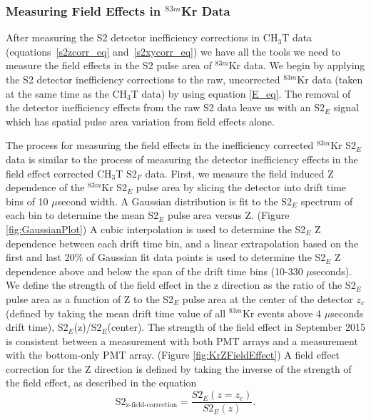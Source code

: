  
\subsubsection{Measuring Field Effects in $^{83m}$Kr Data} \label{section:FieldEffects}

After measuring the S2 detector inefficiency corrections in CH$_3$T data (equations~\ref{s2zcorr_eq} and~\ref{s2xycorr_eq}) we have all the tools we need to measure the field effects in the S2 pulse area of $^{83m}$Kr data.  We begin by applying the S2 detector inefficiency corrections to the raw,  uncorrected $^{83m}$Kr data (taken at the same time as the CH$_3$T data) by using equation \ref{E_eq}.  The removal of the detector inefficiency effects from the raw S2 data leave us with an S2$_E$ signal which has spatial pulse area variation from field effects alone.

The process for measuring the field effects in the inefficiency corrected $^{83m}$Kr S2$_E$ data is similar to the process of measuring the detector inefficiency effects in the field effect corrected CH$_3$T S2$_F$ data.  First, we measure the field induced Z dependence of the $^{83m}$Kr S2$_E$ pulse area by slicing the detector into drift time bins of 10 $\mu$second width.  A Gaussian distribution is fit to the S2$_E$ spectrum of each bin to determine the mean S2$_E$ pulse area versus Z. (Figure \ref{fig:GaussianPlot})  A cubic interpolation is used to determine the S2$_E$ Z dependence between each drift time bin, and a linear extrapolation based on the first and last 20\% of Gaussian fit data points is used to determine the S2$_E$ Z dependence above and below the span of the drift time bins (10-330 $\mu$seconds).  We define the strength of the field effect in the z direction as the ratio of the S2$_E$ pulse area as a function of Z to the S2$_E$ pulse area at the center of the detector $z_c$ (defined by taking the mean drift time value of all $^{83m}$Kr events above 4 $\mu$seconds drift time), S2$_E$(z)/S2$_E$(center). The strength of the field effect in September 2015 is consistent between a measurement with both PMT arrays and a measurement with the bottom-only PMT array. (Figure \ref{fig:KrZFieldEffect}) A field effect correction for the Z direction is defined by taking the inverse of the strength of the field effect, as described in the equation
\begin{equation}
\mbox{S}2_{\mbox{z-field-correction}} = \frac{S2_E(z=z_c)}{S2_E(z)}.
\end{equation} 


